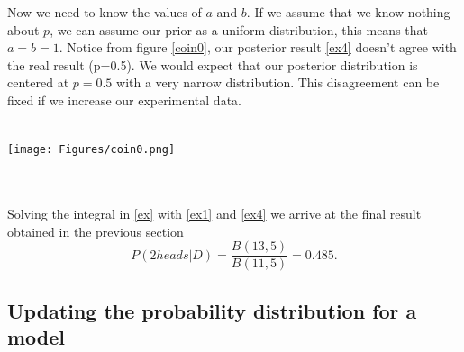\documentclass[onecolumn,           %
               showpacs,            %
               preprintnumbers,     %
               aps,                 %
               letterpaper,             %
               superscriptaddress,      %
               nofootinbib,         %
               tightenlines,        %
               floats,floatfix      %
               ,usenatbib,
               ]{revtex4-1}
\begin{document}
Now we need to know the values of $a$ and $b$. If we assume that we know nothing about $p$, we can assume our prior as a uniform distribution, this means that $a=b=1$. 
Notice from figure \ref{coin0}, our posterior result \eqref{ex4} doesn't agree with the real result (p=0.5). We would expect that our posterior distribution is centered at $p=0.5$ with a very narrow distribution. This disagreement can be fixed if we increase our experimental data.\\ $ $\\
\begin{minipage}{\textwidth}
\centering
\texttt{[image: Figures/coin0.png]}
\label{coin0}
\end{minipage}
\\$ $ \\
Solving the integral in \eqref{ex} with \eqref{ex1} and \eqref{ex4} we arrive at the final result obtained in the previous section
\begin{equation}
P(2heads|D)=\frac{B(13,5)}{B(11,5)}=0.485.
\end{equation}
%
%
%
\subsection{Updating the probability distribution for a model} 
\end{document}
